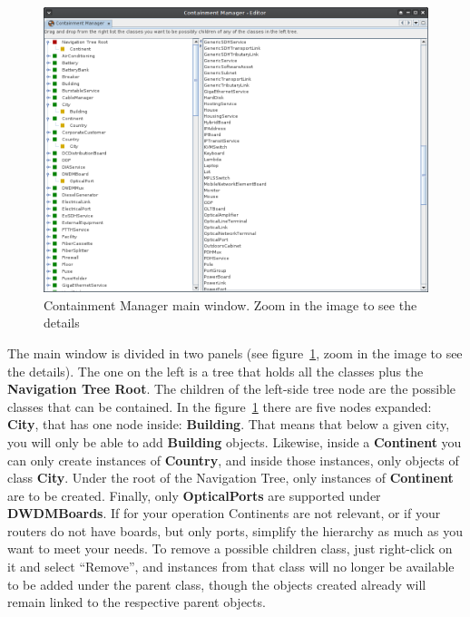 \documentclass[a4paper]{article}
\begin{document}
	\begin{figure}[h!]
		\centering
		\includegraphics[width=0.6\linewidth]{img/containment_manager.png}
		\caption{Containment Manager main window. Zoom in the image to see the details}
		\label{fig:containment_manager}
	\end{figure}
	The main window is divided in two panels (see figure~\ref{fig:containment_manager}, zoom in the image to see the details). The one on the left is a tree that holds all the classes plus the \textbf{Navigation Tree Root}. The children of the left-side tree node are the possible classes that can be contained. In the figure~\ref{fig:containment_manager} there are five nodes expanded: \textbf{City}, that has one node inside: \textbf{Building}. That means that below a given city, you will only be able to add \textbf{Building} objects. Likewise, inside a \textbf{Continent} you can only create instances of \textbf{Country}, and inside those instances, only objects of class \textbf{City}. Under the root of the Navigation Tree, only instances of \textbf{Continent} are to be created. Finally, only \textbf{OpticalPorts} are supported under \textbf{DWDMBoards}. If for your operation Continents are not relevant, or if your routers do not have boards, but only ports, simplify the hierarchy as much as you want to meet your needs. To remove a possible children class, just right-click on it and select “Remove”, and instances from that class will no longer be available to be added under the parent class, though the objects created already will remain linked to the respective parent objects.
\end{document}
